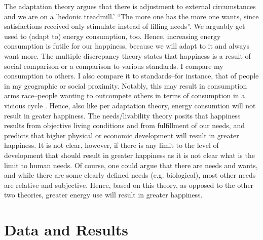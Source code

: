 \documentclass[10pt, letterpaper]{article}
\begin{document}
\begin{spacing}{1.4}
The adaptation theory \citep{brickman78cj} argues that there is
adjustment to external circumstances and we are on a 'hedonic
treadmill.' ``The more one has the more one wants, since satisfactions
received only stimulate instead of filling needs''\citep{durkheim50}. 
We arguably get used to (adapt to) energy consumption, too. Hence, increasing
energy consumption is futile for our happiness, because we will adapt to it and
always want more.
%
The  multiple discrepancy theory  \citep{michalos85} states that
happiness is a result of social comparison or a comparison to various
standards.  I compare my consumption to others. I also compare
it to standards--for instance, that of people in my geographic or social
proximity. Notably, this may result in consumption arms race--people wanting to
outcompete others in terms of consumption in a vicious
cycle \citep{frank12}. Hence, also like  per adaptation theory, energy consumtion
will not result in geater happiness.  
%
  The needs/livability theory \citep{veenhoven95, veenhoven14b} posits that
  happiness results from objective living conditions and from
  fulfillment of our needs, and predicts that higher physical or economic
  development will result in greater happiness. It is not clear, however, if
  there is any limit to the level of development that should result in greater
  happiness as it is not clear what is the limit to human needs. Of course, one
  could argue that there are needs and wants, and while there are some clearly
  defined needs (e.g. biological), most other needs are relative and
  subjective. Hence, based on this theory, as opposed to the other two theories,
  greater energy use will result in greater happiness.
  

\section{Data and Results}




\end{spacing}
\end{document}

